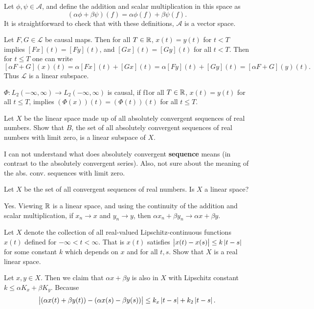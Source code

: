 \begin{solution}
	Let $ \phi,\psi \in \mathcal{A} $, and define the addition and scalar multiplication in this space as
	\[ (\alpha\phi + \beta \psi)(f) = \alpha \phi(f) + \beta\psi(f). \]
	It is straightforward to check that with these definitions, $ \mathcal{A} $ is a vector space.
	
	Let $ F, G \in \mathcal{L} $ be causal maps. Then for all $ T\in\mathbb{R} $, $ x(t) = y(t) $ for $ t <T $ implies $ [Fx](t) = [Fy](t) $, and $ [Gx](t) = [Gy](t) $ for all $ t<T $. Then for $ t\leq T $ one can write
	\[ [\alpha F + G](x)(t) = \alpha [Fx](t) + [Gx](t) = \alpha[Fy](t) + [Gy](t) = [\alpha F+G](y)(t). \]
	Thus $ \mathcal{L} $ is a linear subspace.
\end{solution}

\begin{remark}
	$ \Phi: L_2(-\infty,\infty) \to L_2(-\infty,\infty) $ is causal, if f1or all $ T\in \mathbb{R} $, $ x(t) = y(t) $ for all $ t\leq T $, implies $ (\Phi(x))(t) = (\Phi(t))(t) $ for all $ t\leq T $.
\end{remark}


\begin{problem}
	Let $ X $ be the linear space made up of all absolutely convergent sequences of real numbers. Show that $ B $, the set of all absolutely convergent sequences of real numbers with limit zero, is a linear subspace of $ X $.
\end{problem}
\begin{solution}
	I can not understand what does absolutely convergent \textbf{sequence} means (in contrast to the absolutely convergent series). Also, not sure about the meaning of the abs. conv. sequences with limit zero. 
\end{solution}



\begin{problem}
	Let $ X $ be the set of all convergent sequences of real numbers. Is $ X $ a linear space?
\end{problem}
\begin{solution}
	Yes. Viewing $ \mathbb{R} $ is a linear space, and using the continuity of the addition and scalar multiplication, if $ x_n\to x $ and $ y_n \to y $, then $ \alpha x_n + \beta y_n \to \alpha x+ \beta y $. 
\end{solution}



\begin{problem}
	Let $ X $ denote the collection of all real-valued Lipschitz-continuous functions $ x(t) $ defined for $ -\infty < t < \infty $. That is $ x(t) $ satisfies $ \left|x(t) - x(s)\right| \leq k\left|t-s\right|$ for some constant $ k $ which depends on $ x $ and for all $ t,s $. Show that $ X $ is a real linear space.
\end{problem}
\begin{solution}
	Let $ x,y\in X $. Then we claim that $ \alpha x + \beta y  $ is also in $ X $ with Lipschitz constant $ k \leq \alpha K_x + \beta K_y $. Because
	\[ \left|(\alpha x(t) + \beta y(t)) - (\alpha x(s) - \beta y(s))\right| \leq k_x\left|t-s\right| + k_2\left|t-s\right|. \]
\end{solution}


